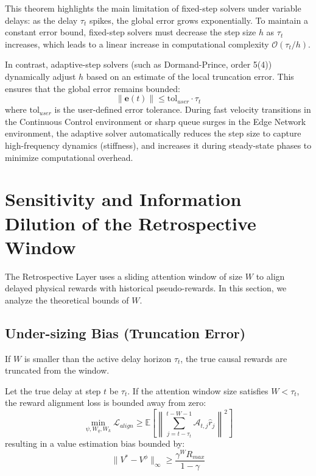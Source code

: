 \documentclass[manuscript, screen, review]{jair}
\begin{document}
This theorem highlights the main limitation of fixed-step solvers under variable delays: as the delay $\tau_t$ spikes, the global error grows exponentially. To maintain a constant error bound, fixed-step solvers must decrease the step size $h$ as $\tau_t$ increases, which leads to a linear increase in computational complexity $\mathcal{O}(\tau_t / h)$.

In contrast, adaptive-step solvers (such as Dormand-Prince, order 5(4)) dynamically adjust $h$ based on an estimate of the local truncation error. This ensures that the global error remains bounded:
\begin{equation}
    \| \mathbf{e}(t) \| \le \text{tol}_{user} \cdot \tau_t
\end{equation}
where $\text{tol}_{user}$ is the user-defined error tolerance. During fast velocity transitions in the Continuous Control environment or sharp queue surges in the Edge Network environment, the adaptive solver automatically reduces the step size to capture high-frequency dynamics (stiffness), and increases it during steady-state phases to minimize computational overhead.

\section{Sensitivity and Information Dilution of the Retrospective Window}\label{app:sec_retrospective_sensitivity}
The Retrospective Layer uses a sliding attention window of size $W$ to align delayed physical rewards with historical pseudo-rewards. In this section, we analyze the theoretical bounds of $W$.

\subsection{Under-sizing Bias (Truncation Error)}\label{app:sub_undersizing}
If $W$ is smaller than the active delay horizon $\tau_t$, the true causal rewards are truncated from the window.

\begin{theorem}\label{thm:truncation_bias}
Let the true delay at step $t$ be $\tau_t$. If the attention window size satisfies $W < \tau_t$, the reward alignment loss is bounded away from zero:
\begin{equation}
    \min_{\psi, W_q, W_k} \mathcal{L}_{align} \ge \mathbb{E} \left[ \left\| \sum_{j=t-\tau_t}^{t-W-1} \mathcal{A}_{t, j} \hat{r}_j \right\|^2 \right]
\end{equation}
resulting in a value estimation bias bounded by:
\begin{equation}
    \| V^* - V^\phi \|_\infty \ge \frac{\gamma^W R_{max}}{1-\gamma}
\end{equation}
\end{theorem}
\end{document}
